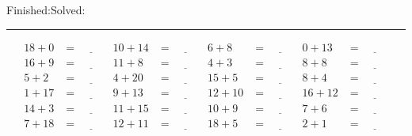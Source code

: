 \documentclass{article}
\begin{document}
\begin{sloppy}
\begin{center}
{\selectfont {Started:}\underline{\hspace{1.5cm}}{Finished:}\underline{\hspace{1.5cm}}{Solved:}\underline{\hspace{1.5cm}}}
\end{center}
\hrule
\begin{align*}
    {18} + {0} &= \underline{\hspace{1cm}} & {10} + {14} &= \underline{\hspace{1cm}} & {6} + {8} &= \underline{\hspace{1cm}} & {0} + {13} &= \underline{\hspace{1cm}} \\
    {16} + {9} &= \underline{\hspace{1cm}} & {11} + {8} &= \underline{\hspace{1cm}} & {4} + {3} &= \underline{\hspace{1cm}} & {8} + {8} &= \underline{\hspace{1cm}} \\
    {5} + {2} &= \underline{\hspace{1cm}} & {4} + {20} &= \underline{\hspace{1cm}} & {15} + {5} &= \underline{\hspace{1cm}} & {8} + {4} &= \underline{\hspace{1cm}} \\
    {1} + {17} &= \underline{\hspace{1cm}} & {9} + {13} &= \underline{\hspace{1cm}} & {12} + {10} &= \underline{\hspace{1cm}} & {16} + {12} &= \underline{\hspace{1cm}} \\
    {14} + {3} &= \underline{\hspace{1cm}} & {11} + {15} &= \underline{\hspace{1cm}} & {10} + {9} &= \underline{\hspace{1cm}} & {7} + {6} &= \underline{\hspace{1cm}} \\
    {7} + {18} &= \underline{\hspace{1cm}} & {12} + {11} &= \underline{\hspace{1cm}} & {18} + {5} &= \underline{\hspace{1cm}} & {2} + {1} &= \underline{\hspace{1cm}} \\

\end{align*}
\end{sloppy}
\end{document}
